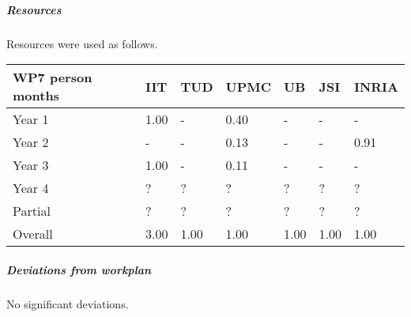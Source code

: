 

\subparagraph*{Resources}

Resources were used as follows.

\begin{center}
\begin{tabular}{|C{1.5cm}|C{1.5cm}|C{1.5cm}|C{2cm}|C{2cm}|C{2cm}|C{2cm}|}
\hline
\footnotesize \textbf{WP7 person months}& \footnotesize \textbf{IIT}&\footnotesize \textbf{TUD}&\footnotesize \textbf{UPMC}& \footnotesize \textbf{UB} &\footnotesize \textbf{JSI} & \footnotesize \textbf{INRIA} \\ \hline
\footnotesize Year 1 &  1.00 & -    & 0.40 & -    & -    & - \\  \hline
\footnotesize Year 2 &  -    & -    & 0.13 & -    & -    & 0.91 \\  \hline
\footnotesize Year 3 &  1.00 & - & 0.11 & - & - & - \\ \hline
\footnotesize Year 4  & ?     & ?    & ?    & ?    & ?    & ?    \\   	\hline
\footnotesize Partial & ?     & ?    & ?    & ?    & ?    & ?    \\
\hline \hline
\footnotesize Overall & 3.00 & 1.00 & 1.00 & 1.00 & 1.00 & 1.00 \\ \hline
\end{tabular}
\end{center}

\subparagraph*{Deviations from workplan} 
No significant deviations. 